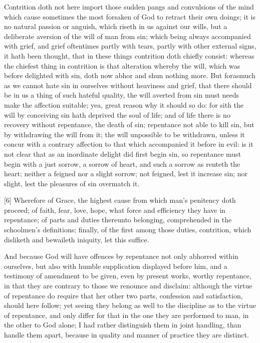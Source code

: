 Contrition doth not here import those sudden pangs and convulsions of the mind which cause sometimes the most forsaken of God to retract their own doings; it is no natural passion or anguish, which riseth in us against our wills, but a deliberate aversion of the will of man from sin; which being always accompanied with grief, and grief oftentimes partly with tears, partly with other external signs, it hath been thought, that in these things contrition doth chiefly consist:  whereas the chiefest thing in contrition is that alteration whereby the will, which was before delighted with sin, doth now abhor and shun nothing more. But forasmuch as we cannot hate sin in ourselves without heaviness and grief, that there should be in us a thing of such hateful quality, the will averted from sin must needs make the affection suitable; yea, great reason why it should so do: for sith the will by conceiving sin hath deprived the soul of life; and of life there is no recovery without repentance, the death of sin; repentance not able to kill sin, but by withdrawing the will from it; the will unpossible to be withdrawn, unless it concur with a contrary affection to that which accompanied it before in evil: is it not clear that as an inordinate delight did first begin sin, so repentance must begin with a just sorrow, a sorrow of heart, and such a sorrow as renteth the heart; neither a feigned nor a slight sorrow; not feigned, lest it increase sin; nor slight, lest the pleasures of sin overmatch it.

[6] Wherefore of Grace, the highest cause from which man’s penitency doth proceed; of faith, fear, love, hope, what force and efficiency they have in repentance; of parts and duties thereunto belonging, comprehended in the schoolmen’s definitions; finally, of the first among those duties, contrition, which disliketh and bewaileth iniquity, let this suffice.

And because God will have offences by repentance not only abhorred within ourselves, but also with humble supplication displayed before him, and a testimony of amendment to be given, even by present works, worthy repentance, in that they are contrary to those we renounce and disclaim: although the virtue of repentance do require that her other two parts, confession and satisfaction, should here follow; yet seeing they belong as well to the discipline as to the virtue of repentance, and only differ for that in the one they are performed to man, in the other to God alone; I had rather distinguish them in joint handling, than handle them apart, because in quality and manner of practice they are distinct.

